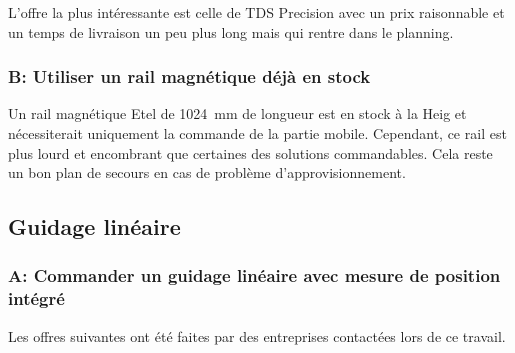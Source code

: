 \begin{table}[H]
  \centering
  \caption{Offres pour le moteur linéaire}
  \label{tab:OffreMot}
\end{table}

L'offre la plus intéressante est celle de TDS Precision \cite{TDSPrecisionProducts} avec un prix raisonnable et un temps de livraison un peu plus long mais qui rentre dans le planning.

\subsubsection{B: Utiliser un rail magnétique déjà en stock}
Un rail magnétique Etel \cite{Etel} de 1024~mm de longueur est en stock à la \acrshort{Heig} et nécessiterait uniquement la commande de la partie mobile. Cependant, ce
rail est plus lourd et encombrant que certaines des solutions commandables. Cela reste un bon plan de secours en cas de problème d'approvisionnement.

\subsection{Guidage linéaire}
\subsubsection{A: Commander un guidage linéaire avec mesure de position intégré}
Les offres suivantes ont été faites par des entreprises contactées lors de ce travail.

